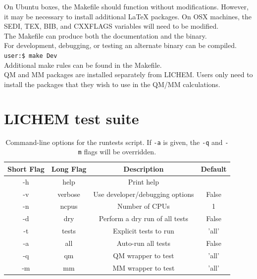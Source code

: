 \documentclass[12pt]{report}
\begin{document}

On Ubuntu boxes, the Makefile should function without modifications.
However, it may be necessary to install additional LaTeX packages.
On OSX machines, the SEDI, TEX, BIB, and CXXFLAGS variables will need to be
modified. \\

The Makefile can produce both the documentation and the binary. \\

For development, debugging, or testing an alternate binary can be compiled. \\

\texttt{user:\$ make Dev} \\

Additional make rules can be found in the Makefile. \\

QM and MM packages are installed separately from LICHEM.
Users only need to install the packages that they wish to use in the
QM/MM calculations.

\section{LICHEM test suite}

\begin{table}[hbt]
 \centering
 \begin{tabular}{|c|c|c|c|}
 \hline
 Short Flag & Long Flag   & Description                     & Default\\ \hline
 -h         & \-\-help    & Print help                      & \\
 -v         & \-\-verbose & Use developer/debugging options & False \\
 -n         & \-\-ncpus   & Number of CPUs                  & 1 \\
 -d         & \-\-dry     & Perform a dry run of all tests  & False \\
 -t         & \-\-tests   & Explicit tests to run           & 'all' \\
 -a         & \-\-all     & Auto-run all tests              & False \\
 -q         & \-\-qm      & QM wrapper to test              & 'all' \\
 -m         & \-\-mm      & MM wrapper to test              & 'all' \\
 \hline
 \end{tabular}
 \caption{
 Command-line options for the runtests script. If \texttt{-a} is given, the
 \texttt{-q} and \texttt{-m} flags will be overridden.}
 \label{tab:TestOpts}
\end{table}
\end{document}
